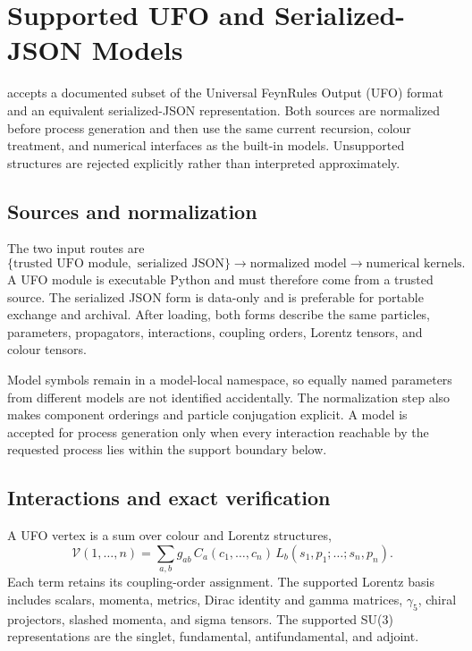 \section{Supported UFO and Serialized-JSON Models}
\label{sec:ufo-support}

\PAC{} accepts a documented subset of the Universal FeynRules Output (UFO)
format and an equivalent serialized-JSON representation. Both sources are
normalized before process generation and then use the same current recursion,
colour treatment, and numerical interfaces as the built-in models. Unsupported
structures are rejected explicitly rather than interpreted approximately.

\subsection{Sources and normalization}

The two input routes are
\begin{equation}
  \{\text{trusted UFO module},\text{ serialized JSON}\}
  \longrightarrow
  \text{normalized model}
  \longrightarrow
  \text{numerical kernels}.
  \label{eq:ufo-loading-route}
\end{equation}
A UFO module is executable Python and must therefore come from a trusted
source. The serialized JSON form is data-only and is preferable for portable
exchange and archival. After loading, both forms describe the same particles,
parameters, propagators, interactions, coupling orders, Lorentz tensors, and
colour tensors.

Model symbols remain in a model-local namespace, so equally named parameters
from different models are not identified accidentally. The normalization step
also makes component orderings and particle conjugation explicit. A model is
accepted for process generation only when every interaction reachable by the
requested process lies within the support boundary below.

\subsection{Interactions and exact verification}

A UFO vertex is a sum over colour and Lorentz structures,
\begin{equation}
  \mathcal V(1,\ldots,n)
  =\sum_{a,b}g_{ab}\,
    C_a(c_1,\ldots,c_n)\,
    L_b(s_1,p_1;\ldots;s_n,p_n).
  \label{eq:ufo-vertex-matrix}
\end{equation}
Each term retains its coupling-order assignment. The supported Lorentz basis
includes scalars, momenta, metrics, Dirac identity and gamma matrices,
\(\gamma_5\), chiral projectors, slashed momenta, and sigma tensors. The
supported SU(3) representations are the singlet, fundamental,
antifundamental, and adjoint.


